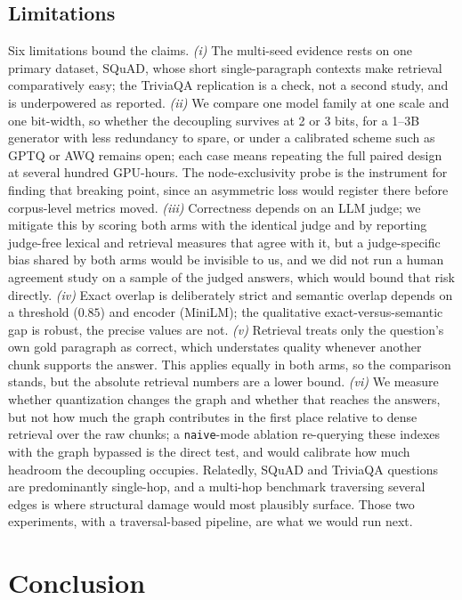 \documentclass[conference, table]{IEEEtran}
\begin{document}
\subsection{Limitations}

\noindent
Six limitations bound the claims. \emph{(i)} The multi-seed evidence rests on one primary dataset, SQuAD, whose short single-paragraph contexts make retrieval comparatively easy; the TriviaQA replication is a check, not a second study, and is underpowered as reported. \emph{(ii)} We compare one model family at one scale and one bit-width, so whether the decoupling survives at 2 or 3 bits, for a 1--3B generator with less redundancy to spare, or under a calibrated scheme such as GPTQ or AWQ remains open; each case means repeating the full paired design at several hundred GPU-hours. The node-exclusivity probe is the instrument for finding that breaking point, since an asymmetric loss would register there before corpus-level metrics moved. \emph{(iii)} Correctness depends on an LLM judge; we mitigate this by scoring both arms with the identical judge and by reporting judge-free lexical and retrieval measures that agree with it, but a judge-specific bias shared by both arms would be invisible to us, and we did not run a human agreement study on a sample of the judged answers, which would bound that risk directly. \emph{(iv)} Exact overlap is deliberately strict and semantic overlap depends on a threshold ($0.85$) and encoder (MiniLM); the qualitative exact-versus-semantic gap is robust, the precise values are not. \emph{(v)} Retrieval treats only the question's own gold paragraph as correct, which understates quality whenever another chunk supports the answer. This applies equally in both arms, so the comparison stands, but the absolute retrieval numbers are a lower bound. \emph{(vi)} We measure whether quantization changes the graph and whether that reaches the answers, but not how much the graph contributes in the first place relative to dense retrieval over the raw chunks; a \texttt{naive}-mode ablation re-querying these indexes with the graph bypassed is the direct test, and would calibrate how much headroom the decoupling occupies. Relatedly, SQuAD and TriviaQA questions are predominantly single-hop, and a multi-hop benchmark traversing several edges is where structural damage would most plausibly surface. Those two experiments, with a traversal-based pipeline, are what we would run next.

\section{Conclusion}\label{sec:conclusion}
\end{document}
